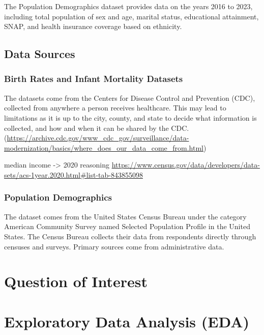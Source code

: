 \documentclass[
  letterpaper,
  DIV=11,
  numbers=noendperiod]{scrartcl}
\begin{document}
The Population Demographics dataset provides data on the years 2016 to
2023, including total population of sex and age, marital status,
educational attainment, SNAP, and health insurance coverage based on
ethnicity.

\subsection{Data Sources}\label{data-sources}

\subsubsection{Birth Rates and Infant Mortality
Datasets}\label{birth-rates-and-infant-mortality-datasets}

The datasets come from the Centers for Disease Control and Prevention
(CDC), collected from anywhere a person receives healthcare. This may
lead to limitations as it is up to the city, county, and state to decide
what information is collected, and how and when it can be shared by the
CDC.
(\url{https://archive.cdc.gov/www_cdc_gov/surveillance/data-modernization/basics/where_does_our_data_come_from.html})

median income -\textgreater{} 2020 reasoning
\url{https://www.census.gov/data/developers/data-sets/acs-1year.2020.html\#list-tab-843855098}

\subsubsection{Population Demographics}\label{population-demographics}

The dataset comes from the United States Census Bureau under the
category American Community Survey named Selected Population Profile in
the United States. The Census Bureau collects their data from
respondents directly through censuses and surveys. Primary sources come
from administrative data.

\section{Question of Interest}\label{question-of-interest}

\section{Exploratory Data Analysis
(EDA)}\label{exploratory-data-analysis-eda}

\subsection{}\label{section}
\end{document}
